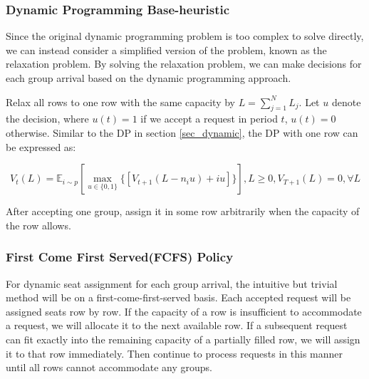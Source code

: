\subsubsection{Dynamic Programming Base-heuristic}
Since the original dynamic programming problem is too complex to solve directly, we can instead consider a simplified version of the problem, known as the relaxation problem. By solving the relaxation problem, we can make decisions for each group arrival based on the dynamic programming approach.


Relax all rows to one row with the same capacity by $L = \sum_{j=1}^{N} L_j$. Let $u$ denote the decision, where $u(t) = 1$ if we accept a request in period $t$, $u(t) =0$ otherwise. Similar to the DP in section \ref{sec_dynamic}, the DP with one row can be expressed as:

$$V_{t}(L) = \mathbb{E}_{i \sim p} [\max_{u \in \{0,1\}} \{ {[V_{t+1}(L-n_i u)+ i u]}\}], L \geq 0, V_{T+1}(L) =0, \forall L$$

After accepting one group, assign it in some row arbitrarily when the capacity of the row allows.

\subsubsection{First Come First Served(FCFS) Policy}\label{largest_pattern}
For dynamic seat assignment for each group arrival, the intuitive but trivial method will be on a first-come-first-served basis. Each accepted request will be assigned seats row by row. If the capacity of a row is insufficient to accommodate a request, we will allocate it to the next available row. If a subsequent request can fit exactly into the remaining capacity of a partially filled row, we will assign it to that row immediately. Then continue to process requests in this manner until all rows cannot accommodate any groups.

